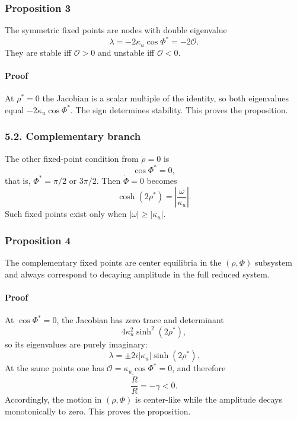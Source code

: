 \documentclass[
]{article}
\begin{document}
\subsubsection{Proposition 3}\label{proposition-3}

The symmetric fixed points are nodes with double eigenvalue \[
\lambda = -2\kappa_{u}\cos\Phi^* = -2\mathcal{O}.
\] They are stable iff \(\mathcal{O}>0\) and unstable iff
\(\mathcal{O}<0\).

\paragraph{Proof}\label{proof-2}

At \(\rho^*=0\) the Jacobian is a scalar multiple of the identity, so
both eigenvalues equal \(-2\kappa_{u}\cos\Phi^*\). The sign determines
stability. This proves the proposition.

\subsubsection{5.2. Complementary branch}\label{complementary-branch}

The other fixed-point condition from \(\dot{\rho}=0\) is \[
\cos\Phi^* = 0,
\] that is, \(\Phi^* = \pi/2\) or \(3\pi/2\). Then \(\dot{\Phi}=0\)
becomes \[
\cosh(2\rho^*) = \left|\frac{\omega}{\kappa_{u}}\right|.
\] Such fixed points exist only when \(|\omega| \ge |\kappa_{u}|\).

\subsubsection{Proposition 4}\label{proposition-4}

The complementary fixed points are center equilibria in the
\((\rho,\Phi)\) subsystem and always correspond to decaying amplitude in
the full reduced system.

\paragraph{Proof}\label{proof-3}

At \(\cos\Phi^*=0\), the Jacobian has zero trace and determinant \[
4\kappa_{u}^2 \sinh^2(2\rho^*),
\] so its eigenvalues are purely imaginary: \[
\lambda = \pm 2i|\kappa_{u}|\sinh(2\rho^*) .
\] At the same points one has
\(\mathcal{O} = \kappa_{u}\cos\Phi^* = 0\), and therefore \[
\frac{\dot{R}}{R} = -\gamma < 0.
\] Accordingly, the motion in \((\rho,\Phi)\) is center-like while the
amplitude decays monotonically to zero. This proves the proposition.
\end{document}
